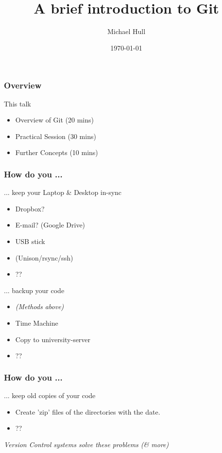 \documentclass{beamer}
\title[A brief introduction to Git]{A brief introduction to Git}
\author{Michael Hull}
\institute[University of Edinburgh]
{
University of Edinburgh \\
\medskip
{\emph{mikehulluk@googlemail.com}}
}
\date{\today}
\begin{document}
%
\begin{frame}
\titlepage
\end{frame}
%



\begin{frame}
\frametitle{Overview}
\begin{block}
{This talk}
\begin{itemize}
\item Overview of Git (20 mins)
\item Practical Session (30 mins)
\item Further Concepts (10 mins)
\end{itemize}
\end{block}
\end{frame}



\begin{frame}
\frametitle{How do you ...}

\begin{block}
{ ... keep your Laptop \& Desktop in-sync}
\begin{itemize}
\item Dropbox?
\item E-mail? (Google Drive)
\item USB stick
\item (Unison/rsync/ssh)
\item ??
\end{itemize}
\end{block}

\pause

\begin{block}
{... backup your code}
\begin{itemize}
\item \emph{(Methods above)} 
\item Time Machine 
\item Copy to university-server
\item ??
\end{itemize}
\end{block}

\end{frame}



\begin{frame}
\frametitle{How do you ...}
\begin{block}
{... keep old copies of your code}	
\begin{itemize}
\item Create 'zip' files of the directories with the date. 
\item ??
\end{itemize}
\end{block}

\pause

\begin{block}
{ \emph{Version Control systems solve these problems (\& more)}	}
\end{block}




\end{frame}
\end{document}

